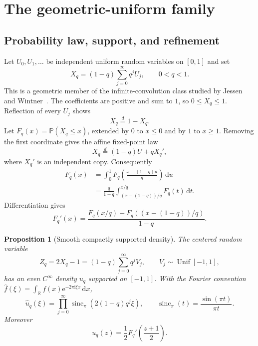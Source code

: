 \documentclass[11pt,a4paper,oneside]{article}
\newtheorem{proposition}[proposition]{Proposition}
\theoremstyle{definition}
\theoremstyle{remark}
\newcommand{\R}{\mathbb R}
\newcommand{\Prob}{\mathbb P}
\newcommand{\dd}{\,\mathrm d}
\newcommand{\e}{\mathrm e}
\newcommand{\ii}{\mathrm i}
\newcommand{\sincpi}{\operatorname{sinc}_{\pi}}
\begin{document}
\section{The geometric-uniform family}
\label{sec:geometric-uniform}

\subsection{Probability law, support, and refinement}

Let $U_0,U_1,\ldots$ be independent uniform random variables on $[0,1]$ and
set
\begin{equation}
 X_q=(1-q)\sum_{j=0}^\infty q^jU_j,
 \qquad 0<q<1.
 \label{eq:Xq-definition}
\end{equation}
This is a geometric member of the infinite-convolution class studied by
Jessen and Wintner~\cite{JessenWintner1935}.  The coefficients are positive
and sum to $1$, so $0\le X_q\le1$.  Reflection
of every $U_j$ shows
\begin{equation}
 X_q\stackrel d=1-X_q.
 \label{eq:Xq-symmetry}
\end{equation}
Let $F_q(x)=\Prob(X_q\le x)$, extended by $0$ to $x\le0$ and by $1$ to
$x\ge1$.  Removing the first coordinate gives the affine fixed-point law
\begin{equation}
 X_q\stackrel d=(1-q)U+qX_q',
 \label{eq:Xq-fixed-point}
\end{equation}
where $X_q'$ is an independent copy.  Consequently
\begin{align}
 F_q(x)
 &=\int_0^1F_q\!\left(\frac{x-(1-q)u}{q}\right)\dd u
 \label{eq:Fq-integral-equation}\\
 &=\frac q{1-q}
 \int_{(x-(1-q))/q}^{x/q}F_q(t)\dd t.
 \label{eq:Fq-integral-equation-2}
\end{align}
Differentiation gives
\begin{equation}
 F_q'(x)=\frac{F_q(x/q)-F_q((x-(1-q))/q)}{1-q}.
 \label{eq:Fq-derivative}
\end{equation}

\begin{proposition}[Smooth compactly supported density]
\label{prop:uq-smooth}
The centered random variable
\begin{equation}
 Z_q=2X_q-1=(1-q)\sum_{j=0}^\infty q^jV_j,
 \qquad V_j\sim\operatorname{Unif}[-1,1],
 \label{eq:Zq-definition}
\end{equation}
has an even $C^\infty$ density $u_q$ supported on $[-1,1]$.  With the Fourier
convention
$\widehat f(\xi)=\int_\R f(x)\e^{-2\pi\ii\xi x}\dd x$,
\begin{equation}
 \widehat u_q(\xi)=\prod_{j=0}^\infty
 \sincpi\!\left(2(1-q)q^j\xi\right),
 \qquad
 \sincpi(t)=\frac{\sin(\pi t)}{\pi t}.
 \label{eq:uq-fourier-product}
\end{equation}
Moreover
\begin{equation}
 u_q(z)=\frac12F_q'\!\left(\frac{z+1}{2}\right).
 \label{eq:uq-Fq-relation}
\end{equation}
\end{proposition}
\end{document}
